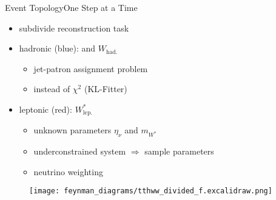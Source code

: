 \documentclass[9pt, aspectratio=169]{beamer}
\begin{document}
\begin{frame}{Event Topology}{One Step at a Time}
	\begin{minipage}{.58\textwidth}
		\begin{itemize}
			\item subdivide reconstruction task
			\item hadronic (blue): \ttbar and $W_\text{had.}$
			\begin{itemize}
				\item jet-patron assignment problem
				\item \spanet instead of $\chi^2$ (KL-Fitter)
			\end{itemize}
			\item leptonic (red): $W^*_\text{lep.}$
			\begin{itemize}
				\item unknown parameters $\eta_\nu$ and $m_{W^*}$ 
				\item underconstrained system $\Rightarrow$ sample parameters 
				\item neutrino weighting
			\end{itemize}
		\end{itemize}
	\end{minipage}
	\begin{minipage}{.4\textwidth}
		\begin{figure}
			\centering
			\texttt{[image: feynman\_diagrams/tthww\_divided\_f.excalidraw.png]}
		\end{figure}
	\end{minipage}
\end{frame}
\end{document}
